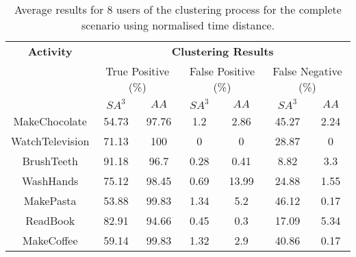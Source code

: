\begin{table}[htbp]\scriptsize
  \begin{center}
        \begin{tabular}{ccccccc}
            \hline            
            \textbf{Activity} & \multicolumn{6}{c}{\textbf{Clustering Results}} \\
             & \multicolumn{2}{c}{True Positive (\%)} & \multicolumn{2}{c}{False Positive (\%)} & \multicolumn{2}{c}{False Negative (\%)} \\
             & $SA^3$ & $AA$ & $SA^3$ & $AA$ & $SA^3$ & $AA$ \\
            \hline
            MakeChocolate   & 54.73 & 97.76 & 1.2  & 2.86 & 45.27 & 2.24 \\
	    WatchTelevision & 71.13 & 100   & 0    & 0    & 28.87 & 0    \\
	    BrushTeeth      & 91.18 & 96.7  & 0.28 & 0.41 & 8.82  & 3.3 \\
	    WashHands       & 75.12 & 98.45 & 0.69 & 13.99  & 24.88 & 1.55 \\
	    MakePasta       & 53.88 & 99.83 & 1.34 & 5.2 & 46.12 & 0.17 \\
	    ReadBook        & 82.91 & 94.66 & 0.45 & 0.3  & 17.09 & 5.34 \\
	    MakeCoffee      & 59.14 & 99.83 & 1.32 & 2.9  & 40.86 & 0.17 \\
            \hline
        \end{tabular}
        \caption{Average results for 8 users of the clustering process for the complete scenario using normalised time distance.}
        \label{tab-r-comp-t2}
    \end{center}
\end{table}


        
        
